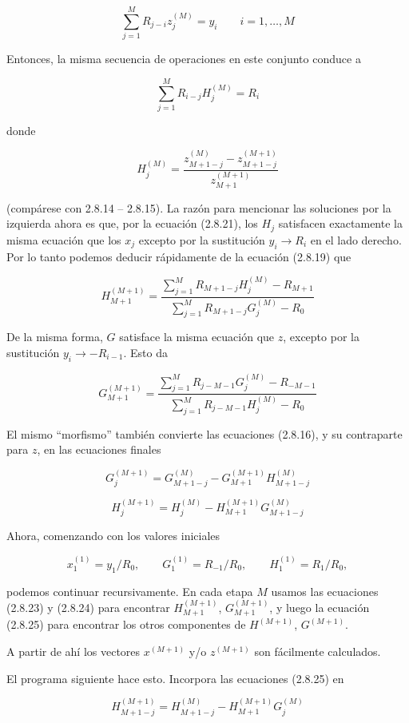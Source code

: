 \documentclass[10pt,a4paper]{book}
\begin{document}
\[
\sum_{j=1}^{M} R_{j-i} z_j^{(M)} = y_i \qquad i = 1, \ldots, M
\tag{2.8.20}
\]

Entonces, la misma secuencia de operaciones en este conjunto conduce a

\[
\sum_{j=1}^{M} R_{i-j} H_j^{(M)} = R_i
\tag{2.8.21}
\]

donde

\[
H_j^{(M)} = \frac{z_{M+1-j}^{(M)} - z_{M+1-j}^{(M+1)}}{z_{M+1}^{(M+1)}}
\tag{2.8.22}
\]

(compárese con 2.8.14 – 2.8.15). La razón para mencionar las soluciones por la izquierda ahora es que, por la ecuación (2.8.21), los $H_j$ satisfacen exactamente la misma ecuación que los $x_j$ excepto por la sustitución $y_i \rightarrow R_i$ en el lado derecho. Por lo tanto podemos deducir rápidamente de la ecuación (2.8.19) que

\[
H_{M+1}^{(M+1)} =
\frac{\sum_{j=1}^{M} R_{M+1-j} H_j^{(M)} - R_{M+1}}
{\sum_{j=1}^{M} R_{M+1-j} G_j^{(M)} - R_0}
\tag{2.8.23}
\]

De la misma forma, $G$ satisface la misma ecuación que $z$, excepto por la sustitución $y_i \rightarrow -R_{i-1}$. Esto da

\[
G_{M+1}^{(M+1)} =
\frac{\sum_{j=1}^{M} R_{j-M-1} G_j^{(M)} - R_{-M-1}}
{\sum_{j=1}^{M} R_{j-M-1} H_j^{(M)} - R_0}
\tag{2.8.24}
\]

El mismo “morfismo” también convierte las ecuaciones (2.8.16), y su contraparte para $z$, en las ecuaciones finales

\[
G_j^{(M+1)} = G_{M+1-j}^{(M)} - G_{M+1}^{(M+1)} H_{M+1-j}^{(M)}
\tag{2.8.25}
\]

\[
H_j^{(M+1)} = H_j^{(M)} - H_{M+1}^{(M+1)} G_{M+1-j}^{(M)}
\tag{2.8.26}
\]

Ahora, comenzando con los valores iniciales

\[
x_1^{(1)} = y_1 / R_0, \qquad
G_1^{(1)} = R_{-1} / R_0, \qquad
H_1^{(1)} = R_1 / R_0,
\tag{2.8.26}
\]

podemos continuar recursivamente. En cada etapa $M$ usamos las ecuaciones (2.8.23) y (2.8.24) para encontrar
$H_{M+1}^{(M+1)}$, $G_{M+1}^{(M+1)}$, y luego la ecuación (2.8.25) para encontrar los otros componentes de $H^{(M+1)}$, $G^{(M+1)}$.

A partir de ahí los vectores $x^{(M+1)}$ y/o $z^{(M+1)}$ son fácilmente calculados.

El programa siguiente hace esto. Incorpora las ecuaciones (2.8.25) en

\[
H_{M+1-j}^{(M+1)} = H_{M+1-j}^{(M)} - H_{M+1}^{(M+1)} G_j^{(M)}
\tag{2.8.27}
\]
\end{document}
